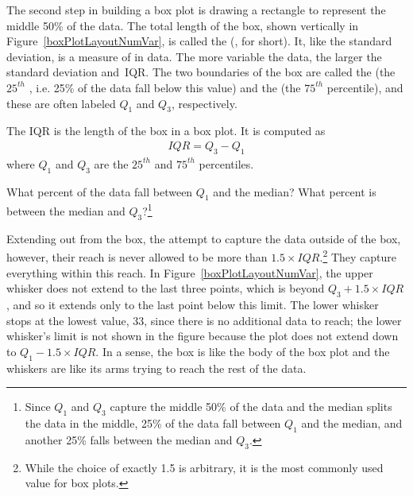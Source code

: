 The second step in building a box plot is drawing a rectangle to represent the middle 50\% of the data. The total length of the box, shown vertically in Figure~\ref{boxPlotLayoutNumVar}, is called the  (, for short). It, like the standard deviation, is a measure of  in data. The more variable the data, the larger the standard deviation and~IQR. The two boundaries of the box are called the   (the $25^{th}$ , i.e. 25\% of the data fall below this value) and the   (the $75^{th}$ percentile), and these are often labeled $Q_1$  and $Q_3$, respectively.

\begin{termBox}{
The IQR is the length of the box in a box plot. It is computed as
\begin{eqnarray*}
IQR = Q_3 - Q_1
\end{eqnarray*}
where $Q_1$ and $Q_3$ are the $25^{th}$ and $75^{th}$ percentiles.}
\end{termBox}

\begin{exercise}
What percent of the data fall between $Q_1$ and the median? What percent is between the median and $Q_3$?\footnote{Since $Q_1$ and $Q_3$ capture the middle 50\% of the data and the median splits the data in the middle, 25\% of the data fall between $Q_1$ and the median, and another 25\% falls between the median and $Q_3$.}
\end{exercise}

Extending out from the box, the  attempt to capture the data outside of the box, however, their reach is never allowed to be more than $1.5\times IQR$.\footnote{While the choice of exactly 1.5 is arbitrary, it is the most commonly used value for box plots.} They capture everything within this reach. In Figure~\ref{boxPlotLayoutNumVar}, the upper whisker does not extend to the last three points, which is beyond $Q_3 + 1.5\times IQR$, and so it extends only to the last point below this limit. The lower whisker stops at the lowest value, 33, since there is no additional data to reach; the lower whisker's limit is not shown in the figure because the plot does not extend down to $Q_1 - 1.5\times IQR$. In a sense, the box is like the body of the box plot and the whiskers are like its arms trying to reach the rest of the data.

